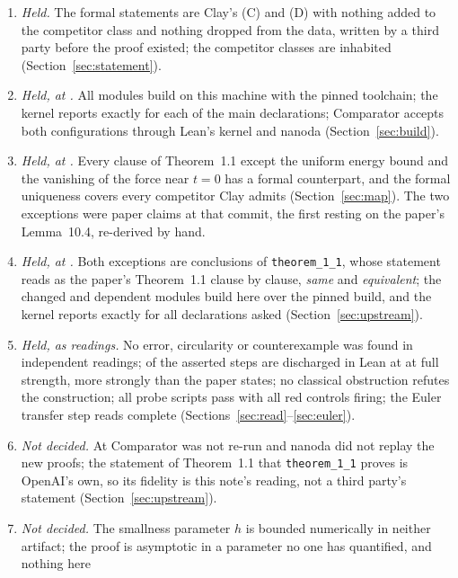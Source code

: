 \documentclass[11pt]{article}
\newcommand{\lean}[1]{\texttt{#1}}
\begin{document}
\begin{enumerate}
\item \emph{Held.} The formal statements are Clay's (C) and (D) with nothing added to the
competitor class and nothing dropped from the data, written by a third party before the
proof existed; the competitor classes are inhabited (Section~\ref{sec:statement}).
\item \emph{Held, at \lean{\LeanCommit}.} All \BuildJobs{} modules build on this machine with
the pinned toolchain; the kernel reports exactly \AxiomList{} for each of the \AxiomDecls{}
main declarations; Comparator accepts both configurations through Lean's kernel and nanoda
(Section~\ref{sec:build}).
\item \emph{Held, at \lean{\LeanCommit}.} Every clause of Theorem~1.1 except the uniform
energy bound and the vanishing of the force near $t=0$ has a formal counterpart, and the
formal uniqueness covers every competitor Clay admits (Section~\ref{sec:map}). The two
exceptions were paper claims at that commit, the first resting on the paper's Lemma~10.4,
re-derived by hand.
\item \emph{Held, at \lean{\UpCommit}.} Both exceptions are conclusions of
\lean{theorem\_1\_1}, whose statement reads as the paper's Theorem~1.1 clause by clause,
\UpFidSame{} \emph{same} and \UpFidEquivalent{} \emph{equivalent}; the \UpBuilt{} changed and
dependent modules build here over the pinned build, and the kernel reports exactly
\AxiomList{} for all \UpAxiomDecls{} declarations asked (Section~\ref{sec:upstream}).
\item \emph{Held, as readings.} No error, circularity or counterexample was found in
\Readers{} independent readings; \TracedFull{} of the \WeakPointsAfterZero{} asserted steps
are discharged in Lean at \lean{\LeanCommit} at full strength, \TracedStronger{} more strongly than the paper
states; no classical obstruction refutes the construction; all \ProbeScripts{} probe scripts
pass with all \ProbeReds{} red controls firing; the Euler transfer step reads complete
(Sections~\ref{sec:read}--\ref{sec:euler}).
\item \emph{Not decided.} At \lean{\UpCommit} Comparator was not re-run and nanoda did not
replay the new proofs; the statement of Theorem~1.1 that \lean{theorem\_1\_1} proves is
OpenAI's own, so its fidelity is this note's reading, not a third party's statement
(Section~\ref{sec:upstream}).
\item \emph{Not decided.} The smallness parameter $h$ is bounded numerically in neither
artifact; the proof is asymptotic in a parameter no one has quantified, and nothing here

\end{enumerate}
\end{document}
